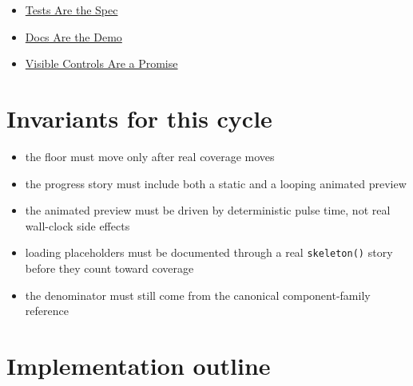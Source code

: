 \begin{itemize}
\tightlist
\item
  \href{https://github.com/flyingrobots/bijou/blob/cbd70612140e7a450d764b3c7be1c6af878b99bc/docs/invariants/tests-are-the-spec.md}{Tests Are the Spec}
\item
  \href{https://github.com/flyingrobots/bijou/blob/cbd70612140e7a450d764b3c7be1c6af878b99bc/docs/invariants/docs-are-the-demo.md}{Docs Are the Demo}
\item
  \href{https://github.com/flyingrobots/bijou/blob/cbd70612140e7a450d764b3c7be1c6af878b99bc/docs/invariants/visible-controls-are-a-promise.md}{Visible Controls Are a Promise}
\end{itemize}

\section{Invariants for this cycle}\label{record-067-invariants-for-this-cycle}

\begin{itemize}
\tightlist
\item
  the floor must move only after real coverage moves
\item
  the progress story must include both a static and a looping animated preview
\item
  the animated preview must be driven by deterministic pulse time, not real wall-clock side effects
\item
  loading placeholders must be documented through a real \texttt{s\allowbreak{}k\allowbreak{}e\allowbreak{}l\allowbreak{}e\allowbreak{}t\allowbreak{}o\allowbreak{}n\allowbreak{}(\allowbreak{})} story before they count toward coverage
\item
  the denominator must still come from the canonical component-family reference
\end{itemize}

\section{Implementation outline}\label{record-067-implementation-outline}

